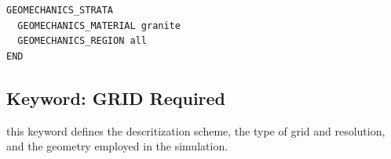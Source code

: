\begin{mdframed}

\footnotesize
\begin{verbatim}
GEOMECHANICS_STRATA
  GEOMECHANICS_MATERIAL granite 
  GEOMECHANICS_REGION all
END
\end{verbatim}
\normalsize
\end{mdframed}



\newpage
\protect\hypertarget{target_grid}{}

\subsection{Keyword: GRID \hfill Required}

\hfill\hyperlink{target_key}{\return}

 this keyword defines the descritization scheme, the type of grid and resolution, and the geometry employed in the simulation.


